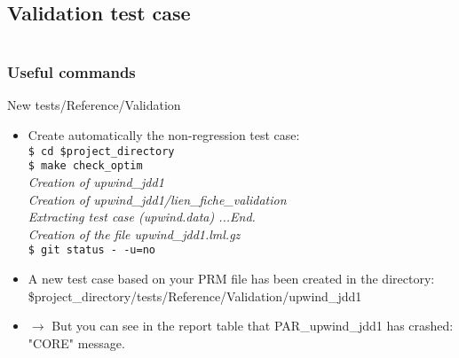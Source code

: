 \documentclass[10pt, hyperref={unicode=true,pdfusetitle, bookmarks=true,bookmarksnumbered=false,bookmarksopen=false, breaklinks=false,pdfborder={0 0 1},backref=true,colorlinks=true,linkcolor=darkblue,pageanchor, urlcolor=darkblue}]{beamer}
\begin{document}
\subsection{{\bf{Validation test case}}}
\begin{frame}
\begin{columns}[c] 
\tableofcontents[sections={1-3},currentsection, currentsubsection]
\tableofcontents[sections={4-8},currentsection, currentsubsection]
\end{columns}
\end{frame}
\begin{frame}
\frametitle{Useful commands}
\begin{block}{New tests/Reference/Validation}

\begin{itemize}
\item Create automatically the non-regression test case:\\
\texttt{\$ cd \$project\_directory}\\
\texttt{\$ make check\_optim}\\
\textit{\hspace{0.1cm} Creation of upwind\_jdd1}\\
\textit{\hspace{0.1cm} Creation of upwind\_jdd1/lien\_fiche\_validation}\\
\textit{\hspace{0.1cm} Extracting test case (upwind.data) ...End.}\\
\textit{\hspace{0.1cm} Creation of the file upwind\_jdd1.lml.gz}\\
\texttt{\$ git status -\,-u=no}\\
\item A new test case based on your PRM file has been created in the directory:\\
\$project\_directory/tests/Reference/Validation/upwind\_jdd1
\item $\rightarrow$ But you can see in the report table that PAR\_upwind\_jdd1 has crashed: "CORE" message.\\
\end{itemize}

\end{block}
\end{frame}
\end{document}
